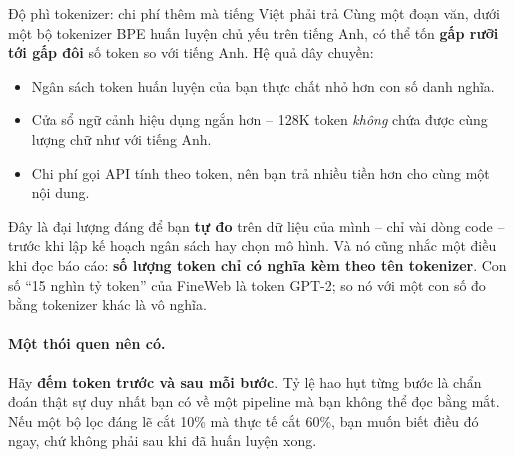 \begin{pitfall}{Độ phì tokenizer: chi phí thêm mà tiếng Việt phải trả}
Cùng một đoạn văn, dưới một bộ tokenizer BPE huấn luyện chủ yếu trên tiếng Anh, có thể tốn \textbf{gấp rưỡi tới gấp đôi} số token so với tiếng Anh. Hệ quả dây chuyền:
\begin{itemize}
	\item Ngân sách token huấn luyện của bạn thực chất nhỏ hơn con số danh nghĩa.
	\item Cửa sổ ngữ cảnh hiệu dụng ngắn hơn -- 128K token \emph{không} chứa được cùng lượng chữ như với tiếng Anh.
	\item Chi phí gọi API tính theo token, nên bạn trả nhiều tiền hơn cho cùng một nội dung.
\end{itemize}
Đây là đại lượng đáng để bạn \textbf{tự đo} trên dữ liệu của mình -- chỉ vài dòng code -- trước khi lập kế hoạch ngân sách hay chọn mô hình. Và nó cũng nhắc một điều khi đọc báo cáo: \textbf{số lượng token chỉ có nghĩa kèm theo tên tokenizer}. Con số “15 nghìn tỷ token” của FineWeb là token GPT-2; so nó với một con số đo bằng tokenizer khác là vô nghĩa.
\end{pitfall}

\paragraph{Một thói quen nên có.} Hãy \textbf{đếm token trước và sau mỗi bước}. Tỷ lệ hao hụt từng bước là chẩn đoán thật sự duy nhất bạn có về một pipeline mà bạn không thể đọc bằng mắt. Nếu một bộ lọc đáng lẽ cắt 10\% mà thực tế cắt 60\%, bạn muốn biết điều đó ngay, chứ không phải sau khi đã huấn luyện xong.
